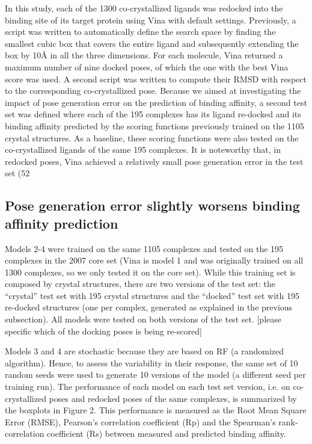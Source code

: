 \documentclass[twocolumn]{bmcart}
\begin{document}
In this study, each of the 1300 co-crystallized ligands was redocked into the binding site of its target protein using Vina with default settings. Previously, a script was written to automatically define the search space by finding the smallest cubic box that covers the entire ligand and subsequently extending the box by 10Å in all the three dimensions. For each molecule, Vina returned a maximum number of nine docked poses, of which the one with the best Vina score was used. A second script was written to compute their RMSD with respect to the corresponding co-crystallized pose. Because we aimed at investigating the impact of pose generation error on the prediction of binding affinity, a second test set was defined where each of the 195 complexes has its ligand re-docked and its binding affinity predicted by the scoring functions previously trained on the 1105 crystal structures. As a baseline, these scoring functions were also tested on the co-crystallized ligands of the same 195 complexes. It is noteworthy that, in redocked poses, Vina achieved a relatively small pose generation error in the test set (52%

\subsection*{Pose generation error slightly worsens binding affinity prediction}

Models 2-4 were trained on the same 1105 complexes and tested on the 195 complexes in the 2007 core set (Vina is model 1 and was originally trained on all 1300 complexes, so we only tested it on the core set). While this training set is composed by crystal structures, there are two versions of the test set: the “crystal” test set with 195 crystal structures and the “docked” test set with 195 re-docked structures (one per complex, generated as explained in the previous subsection). All models were tested on both versions of the test set. [please specific which of the docking poses is being re-scored]

Models 3 and 4 are stochastic because they are based on RF (a randomized algorithm). Hence, to assess the variability in their response, the same set of 10 random seeds were used to generate 10 versions of the model (a different seed per training run). The performance of each model on each test set version, i.e. on co-crystallized poses and redocked poses of the same complexes, is summarized by the boxplots in Figure 2. This performance is measured as the Root Mean Square Error (RMSE), Pearson’s correlation coefficient (Rp) and the Spearman’s rank-correlation coefficient (Rs) between measured and predicted binding affinity.
\end{document}
